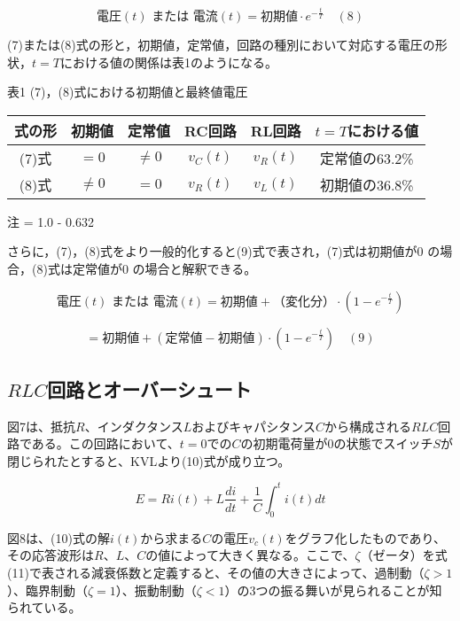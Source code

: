 \documentclass[a4paper,11pt,xelatex,ja=standard]{bxjsarticle}
\begin{document}
        \[
        \text{電圧}(t) \text{ または 電流}(t) = \text{初期値} \cdot e^{-\frac{t}{T}} \quad (8)
        \]
        
        (7)または(8)式の形と，初期値，定常値，回路の種別において対応する電圧の形状，\( t = T \)における値の関係は表1のようになる。
        
        表1 \quad (7)，(8)式における初期値と最終値電圧
        
        \begin{tabular}{cccccc}
            \hline
            式の形 & 初期値 & 定常値 & RC回路 & RL回路 & \( t = T \)における値 \\
            \hline
            (7)式 & \( = 0 \) & \( \neq 0 \) & \( v_C(t) \) & \( v_R(t) \) & 定常値の63.2\% \\
            (8)式 & \( \neq 0 \) & \( = 0 \) & \( v_R(t) \) & \( v_L(t) \) & 初期値の36.8\% \\
            \hline
        \end{tabular}
        
        
        注  = 1.0 - 0.632
        
        さらに，(7)，(8)式をより一般的化すると(9)式で表され，(7)式は初期値が0 の場合，(8)式は定常値が0 の場合と解釈できる。
        
        \[
        \text{電圧}(t) \text{ または 電流}(t) = \text{初期値} + \text{（変化分）} \cdot \left( 1 - e^{-\frac{t}{T}} \right)
        \]
        
        \[
        = \text{初期値} + \left( \text{定常値} - \text{初期値} \right) \cdot \left( 1 - e^{-\frac{t}{T}} \right) \quad (9)
        \]
        
    \subsection{$RLC$回路とオーバーシュート}
    図7は、抵抗$R$、インダクタンス$L$およびキャパシタンス$C$から構成される$RLC$回路である。この回路において、$t = 0$での$C$の初期電荷量が0の状態でスイッチ$S$が閉じられたとすると、KVLより(10)式が成り立つ。

    \begin{equation}
    E = Ri(t) + L \frac{di}{dt} + \frac{1}{C} \int_0^t i(t) dt
    \end{equation}

    図8は、(10)式の解$i(t)$から求まる$C$の電圧$v_c(t)$をグラフ化したものであり、その応答波形は$R$、$L$、$C$の値によって大きく異なる。ここで、$\zeta$（ゼータ）を式(11)で表される減衰係数と定義すると、その値の大きさによって、過制動（$\zeta > 1$）、臨界制動（$\zeta = 1$）、振動制動（$\zeta < 1$）の3つの振る舞いが見られることが知られている。
\end{document}
